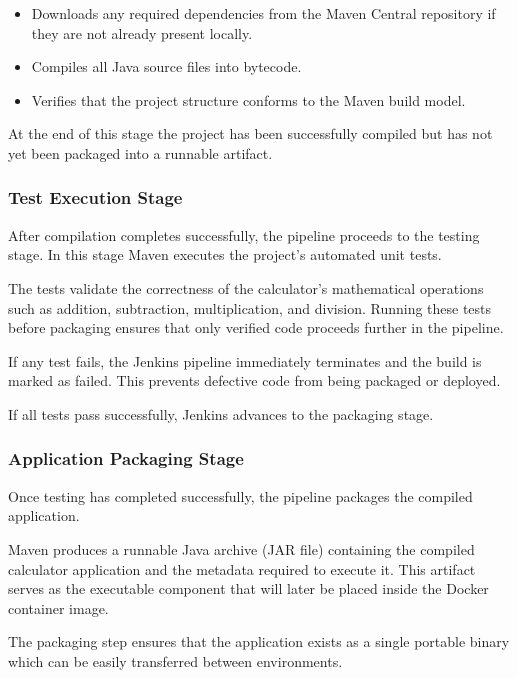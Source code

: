 \documentclass[12pt]{article}
\begin{document}
\begin{itemize}

\item Downloads any required dependencies from the Maven Central repository
if they are not already present locally.

\item Compiles all Java source files into bytecode.

\item Verifies that the project structure conforms to the Maven build model.

\end{itemize}

At the end of this stage the project has been successfully compiled but has not
yet been packaged into a runnable artifact.

\subsubsection{Test Execution Stage}

After compilation completes successfully, the pipeline proceeds to the testing
stage. In this stage Maven executes the project's automated unit tests.

The tests validate the correctness of the calculator's mathematical operations
such as addition, subtraction, multiplication, and division. Running these
tests before packaging ensures that only verified code proceeds further in the
pipeline.

If any test fails, the Jenkins pipeline immediately terminates and the build
is marked as failed. This prevents defective code from being packaged or
deployed.

If all tests pass successfully, Jenkins advances to the packaging stage.

\subsubsection{Application Packaging Stage}

Once testing has completed successfully, the pipeline packages the compiled
application.

Maven produces a runnable Java archive (JAR file) containing the compiled
calculator application and the metadata required to execute it. This artifact
serves as the executable component that will later be placed inside the Docker
container image.

The packaging step ensures that the application exists as a single portable
binary which can be easily transferred between environments.
\end{document}
